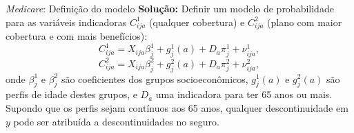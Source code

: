 \documentclass[aspectratio=1610, 10pt]{beamer}
\begin{document}

\begin{frame}{\textit{Medicare}: Definição do modelo}
    \justifying
    \textbf{Solução:} Definir um modelo de probabilidade para as variáveis indicadoras $C^1_{ija}$ (qualquer cobertura) e $C^2_{ija}$ (plano com maior cobertura e com mais benefícios):
    \begin{equation*}
        C^1_{ija} = X_{ija}\beta^1_j + g_j^1(a) + D_a \pi_j^1 + \nu^1_{ija},
        \label{model_endogeneidade1}
    \end{equation*}
    \begin{equation*}
        C^2_{ija} = X_{ija}\beta^2_j + g_j^2(a) + D_a \pi_j^2 + \nu^2_{ija},
        \label{model_endogeneidade2}
    \end{equation*}
    onde $\beta^1_j$ e $\beta^2_j$ são coeficientes dos grupos socioeconômicos, $g_j^1(a)$ e $g_j^2(a)$ são perfis de idade destes grupos, e $D_a$ uma indicadora para ter 65 anos ou mais. Supondo que os perfis sejam contínuos aos 65 anos, qualquer descontinuidade em $y$ pode ser atribuída a descontinuidades no seguro.
\end{frame}
\end{document}

